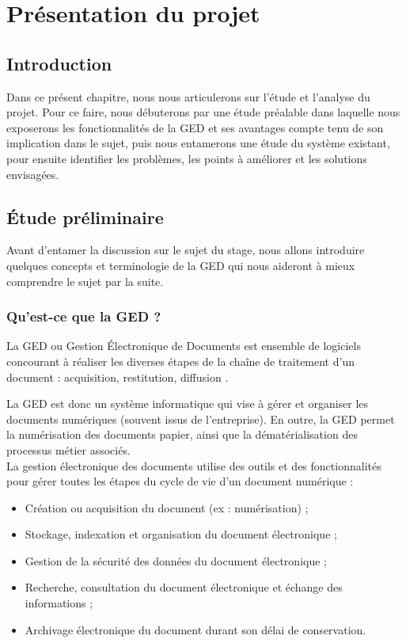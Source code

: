 \section{Présentation du projet}
\subsection*{Introduction}
Dans ce présent chapitre, nous nous articulerons sur l’étude et l’analyse du projet.
Pour ce faire, nous débuterons par une étude préalable dans laquelle nous exposerons les fonctionnalités de la GED et ses avantages compte tenu de son implication dans le sujet, puis nous entamerons une étude du système existant, pour ensuite identifier les problèmes, les points à améliorer et les solutions envisagées.
\subsection{Étude préliminaire}
Avant d'entamer la discussion sur le sujet du stage, nous allons introduire quelques concepts et terminologie de la GED qui nous aideront à mieux comprendre le sujet par la suite.
\subsubsection{Qu'est-ce que la GED ?}
\begin{beware}[title=Définition : ]
    La GED ou Gestion Électronique de Documents est ensemble de logiciels concourant à réaliser les diverses étapes de la chaîne de traitement d’un document : acquisition, restitution, diffusion \cite{ged}.
    \end{beware}
    La GED est donc un système informatique qui vise à
    gérer et organiser les documents numériques (souvent issus de l'entreprise). En outre, la GED permet la numérisation des documents papier, ainsi que la dématérialisation des processus métier associés.\\La gestion électronique des documents utilise des outils et des fonctionnalités pour gérer toutes les étapes du cycle de vie d'un document numérique :
\begin{itemize}
    \item Création ou acquisition du document (ex : numérisation) ;
    \item Stockage, indexation et organisation du document électronique ;
    \item Gestion de la sécurité des données du document électronique ;
    \item Recherche, consultation du document électronique et échange des informations ;
    \item Archivage électronique du document durant son délai de conservation.
\end{itemize}

